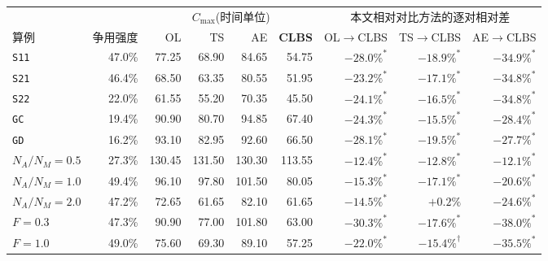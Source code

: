 \begin{tabular}{@{}lrrrrrrrr@{}}
\toprule
& & \multicolumn{4}{c}{$C_{\max}$(时间单位)} & \multicolumn{3}{c}{本文相对对比方法的逐对相对差} \\
\cmidrule(lr){3-6}\cmidrule(lr){7-9}
算例 & 争用强度 & OL & TS & AE & \textbf{CLBS} & OL$\rightarrow$CLBS & TS$\rightarrow$CLBS & AE$\rightarrow$CLBS \\
\midrule
\texttt{S11} & 47.0\% & 77.25 & 68.90 & 84.65 & 54.75 & $-28.0\%^{*}$ & $-18.9\%^{*}$ & $-34.9\%^{*}$ \\
\texttt{S21} & 46.4\% & 68.50 & 63.35 & 80.55 & 51.95 & $-23.2\%^{*}$ & $-17.1\%^{*}$ & $-34.8\%^{*}$ \\
\texttt{S22} & 22.0\% & 61.55 & 55.20 & 70.35 & 45.50 & $-24.1\%^{*}$ & $-16.5\%^{*}$ & $-34.8\%^{*}$ \\
\texttt{GC} & 19.4\% & 90.90 & 80.70 & 94.85 & 67.40 & $-24.3\%^{*}$ & $-15.5\%^{*}$ & $-28.4\%^{*}$ \\
\texttt{GD} & 16.2\% & 93.10 & 82.95 & 92.60 & 66.50 & $-28.1\%^{*}$ & $-19.5\%^{*}$ & $-27.7\%^{*}$ \\
\midrule
$N_A/N_M=0.5$ & 27.3\% & 130.45 & 131.50 & 130.30 & 113.55 & $-12.4\%^{*}$ & $-12.8\%^{*}$ & $-12.1\%^{*}$ \\
$N_A/N_M=1.0$ & 49.4\% & 96.10 & 97.80 & 101.50 & 80.05 & $-15.3\%^{*}$ & $-17.1\%^{*}$ & $-20.6\%^{*}$ \\
$N_A/N_M=2.0$ & 47.2\% & 72.65 & 61.65 & 82.10 & 61.65 & $-14.5\%^{*}$ & $+0.2\%$ & $-24.6\%^{*}$ \\
\midrule
$F=0.3$ & 47.3\% & 90.90 & 77.00 & 101.80 & 63.00 & $-30.3\%^{*}$ & $-17.6\%^{*}$ & $-38.0\%^{*}$ \\
$F=1.0$ & 49.0\% & 75.60 & 69.30 & 89.10 & 57.25 & $-22.0\%^{*}$ & $-15.4\%^{\dagger}$ & $-35.5\%^{*}$ \\
\bottomrule
\end{tabular}
